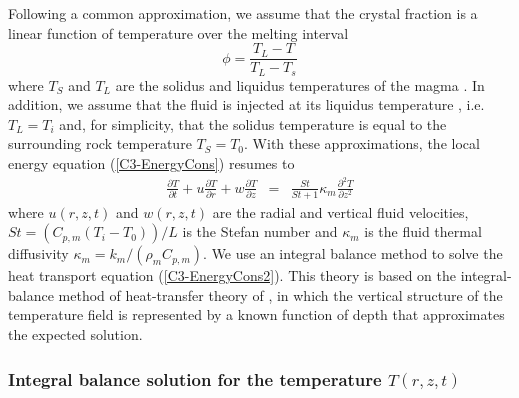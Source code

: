 Following a common approximation, we  assume that the crystal fraction
is a linear function of temperature over the melting interval
\begin{equation}
  \phi = \frac{T_L-T}{T_L-T_s}
  \label{C3-meltfraction}
\end{equation}
where $T_S$ and $T_L$ are the solidus and liquidus temperatures of the
magma \citep{Hort:1997hk,Michaut:2006di}. In  addition, we assume that
the fluid is  injected at its liquidus temperature ,  i.e. $T_L = T_i$
and,  for simplicity,  that the  solidus temperature  is equal  to the
surrounding rock  temperature $T_S  =T_0$. With  these approximations,
the local energy equation (\ref{C3-EnergyCons}) resumes to
\begin{eqnarray}
  \frac{\partial T}{\partial t}+ u\frac{\partial T}{\partial r}
  + w\frac{\partial T}{\partial z}  &=& \frac{ St}{St+1}\kappa_m  \frac{\partial^2
                                        T}{\partial               z^2}
                                        \label{C3-EnergyCons2}
\end{eqnarray}
where  $u(r,z,t)$ and  $w(r,z,t)$ are  the radial  and vertical  fluid
velocities, $St =\left(C_{p,m}(T_i-T_0)\right)/L$ is the Stefan number
and     $\kappa_m$     is     the    fluid     thermal     diffusivity
$\kappa_m = k_m/(\rho_m C_{p,m})$.  We  use an integral balance method
to  solve the  heat transport  equation (\ref{C3-EnergyCons2}).   This
theory is based on the integral-balance method of heat-transfer theory
of  \citet{Goodman:1958ue}, in  which  the vertical  structure of  the
temperature field  is represented  by a known  function of  depth that
approximates the expected solution.

\subsubsection{Integral   balance   solution   for   the   temperature
  $T(r,z,t)$}

